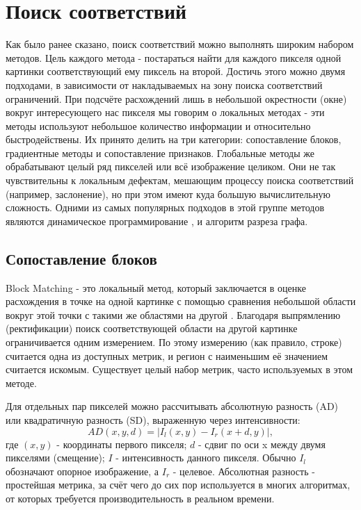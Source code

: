 \section{Поиск соответствий}
\label{matching}
Как было ранее сказано, поиск соответствий можно выполнять широким набором методов. Цель каждого метода - постараться найти для каждого пикселя одной картинки 
соответствующий ему пиксель на второй. Достичь этого можно двумя подходами, в зависимости от накладываемых на зону поиска соответствий ограничений.  При подсчёте 
расхождений лишь в небольшой окрестности (окне) вокруг интересующего нас пикселя мы говорим о локальных методах - эти методы  используют небольшое количество 
информации и относительно быстродействены. Их принято делить на три категории: сопоставление блоков, градиентные методы и 
сопоставление признаков. 		%
Глобальные методы же обрабатывают целый ряд пикселей или всё изображение целиком. Они не так чувствительны к локальным дефектам, мешающим процессу поиска соответствий 
(например, заслонение), но при этом имеют куда большую вычислительную сложность. Одними из самых популярных подходов в этой группе методов являются динамическое программирование \cite{dynamic_prog},
и алгоритм разреза графа. 

\subsection{Сопоставление блоков}
\label{BM}
Block Matching - это локальный метод, который заключается в оценке расхождения в точке на одной картинке с помощью сравнения небольшой области вокруг этой точки с такими же областями 
на другой \cite{}. Благодаря выпрямлению (ректификации) поиск соответствующей области на другой картинке ограничивается одним измерением. По этому измерению (как правило, строке) 
считается одна из доступных метрик, и регион с наименьшим её значением считается искомым. Существует целый набор метрик, часто используемых в этом методе. 

Для отдельных пар пикселей можно рассчитывать абсолютную разность (AD) или квадратичную разность (SD), выраженную через интенсивности:
\begin{equation}
	AD(x, y, d) = |I_l(x,y) - I_r(x+d, y)|,			
	\label{eq:AD}
\end{equation}
где $(x, y)$ - координаты первого пикселя; $d$ - сдвиг по оси x между двумя пикселями (смещение); $I$ - интенсивность данного пикселя. Обычно $I_l$ обозначают опорное изображение, а $I_r$ - 
целевое. Абсолютная разность - простейшая метрика, за счёт чего до сих пор используется в многих алгоритмах, от которых требуется производительность в реальном времени. 

